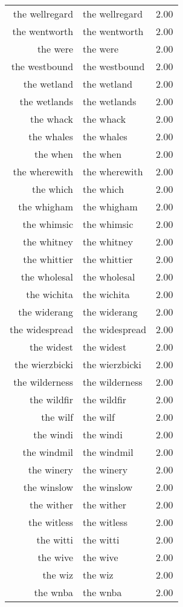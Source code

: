 \begin{table}[ht]
\begin{tabular}{rlr}
  the wellregard & the wellregard & 2.00 \\ 
  the wentworth & the wentworth & 2.00 \\ 
  the were & the were & 2.00 \\ 
  the westbound & the westbound & 2.00 \\ 
  the wetland & the wetland & 2.00 \\ 
  the wetlands & the wetlands & 2.00 \\ 
  the whack & the whack & 2.00 \\ 
  the whales & the whales & 2.00 \\ 
  the when & the when & 2.00 \\ 
  the wherewith & the wherewith & 2.00 \\ 
  the which & the which & 2.00 \\ 
  the whigham & the whigham & 2.00 \\ 
  the whimsic & the whimsic & 2.00 \\ 
  the whitney & the whitney & 2.00 \\ 
  the whittier & the whittier & 2.00 \\ 
  the wholesal & the wholesal & 2.00 \\ 
  the wichita & the wichita & 2.00 \\ 
  the widerang & the widerang & 2.00 \\ 
  the widespread & the widespread & 2.00 \\ 
  the widest & the widest & 2.00 \\ 
  the wierzbicki & the wierzbicki & 2.00 \\ 
  the wilderness & the wilderness & 2.00 \\ 
  the wildfir & the wildfir & 2.00 \\ 
  the wilf & the wilf & 2.00 \\ 
  the windi & the windi & 2.00 \\ 
  the windmil & the windmil & 2.00 \\ 
  the winery & the winery & 2.00 \\ 
  the winslow & the winslow & 2.00 \\ 
  the wither & the wither & 2.00 \\ 
  the witless & the witless & 2.00 \\ 
  the witti & the witti & 2.00 \\ 
  the wive & the wive & 2.00 \\ 
  the wiz & the wiz & 2.00 \\ 
  the wnba & the wnba & 2.00 \\ 

\end{tabular}
\end{table}
